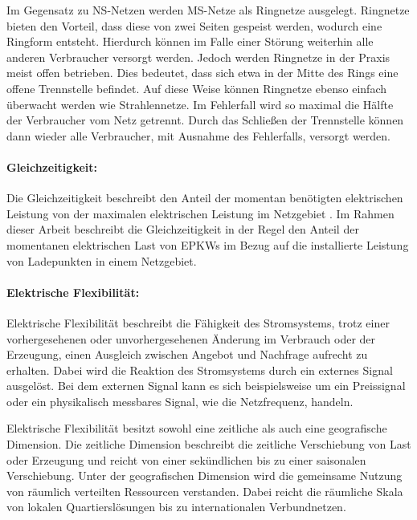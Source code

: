 Im Gegensatz zu \gls{NS}-Netzen werden \gls{MS}-Netze als Ringnetze ausgelegt.
Ringnetze bieten den Vorteil, dass diese von zwei Seiten gespeist werden, wodurch eine Ringform entsteht.
Hierdurch können im Falle einer Störung weiterhin alle anderen Verbraucher versorgt werden.
Jedoch werden Ringnetze in der Praxis meist offen betrieben.
Dies bedeutet, dass sich etwa in der Mitte des Rings eine offene Trennstelle befindet.
Auf diese Weise können Ringnetze ebenso einfach überwacht werden wie Strahlennetze.
Im Fehlerfall wird so maximal die Hälfte der Verbraucher vom Netz getrennt.
Durch das Schließen der Trennstelle können dann wieder alle Verbraucher, mit Ausnahme des Fehlerfalls, versorgt werden. \cite{Agora2019} \cite{WNG2020} \cite{Westermann2019}


\paragraph{Gleichzeitigkeit:}

Die Gleichzeitigkeit beschreibt den Anteil der momentan benötigten elektrischen Leistung von der maximalen elektrischen Leistung im Netzgebiet \cite{Agora2019}.
Im Rahmen dieser Arbeit beschreibt die Gleichzeitigkeit in der Regel den Anteil der momentanen elektrischen Last von \glspl{EPKW} im Bezug auf die installierte Leistung von Ladepunkten in einem Netzgebiet.


\paragraph{Elektrische Flexibilität:}

Elektrische Flexibilität beschreibt die Fähigkeit des Stromsystems, trotz einer vorhergesehenen oder unvorhergesehenen Änderung im Verbrauch oder der Erzeugung, einen Ausgleich zwischen Angebot und Nachfrage aufrecht zu erhalten.
Dabei wird die Reaktion des Stromsystems durch ein externes Signal ausgelöst.
Bei dem externen Signal kann es sich beispielsweise um ein Preissignal oder ein physikalisch messbares Signal, wie die Netzfrequenz, handeln.

Elektrische Flexibilität besitzt sowohl eine zeitliche als auch eine geografische Dimension.
Die zeitliche Dimension beschreibt die zeitliche Verschiebung von Last oder Erzeugung und reicht von einer sekündlichen bis zu einer saisonalen Verschiebung.
Unter der geografischen Dimension wird die gemeinsame Nutzung von räumlich verteilten Ressourcen verstanden.
Dabei reicht die räumliche Skala von lokalen Quartierslösungen bis zu internationalen Verbundnetzen. \cite{BNetzA2017} \cite{IEA2014}


